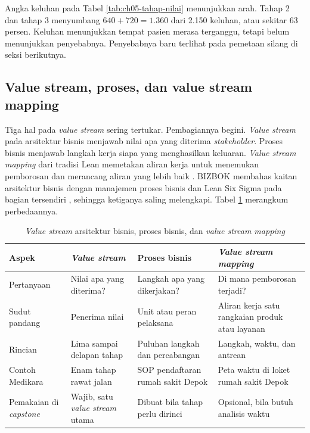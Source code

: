 Angka keluhan pada Tabel \ref{tab:ch05-tahap-nilai} menunjukkan arah. Tahap 2 dan tahap 3
menyumbang $640 + 720 = 1.360$ dari 2.150 keluhan, atau sekitar 63 persen. Keluhan menunjukkan
tempat pasien merasa terganggu, tetapi belum menunjukkan penyebabnya. Penyebabnya baru terlihat
pada pemetaan silang di seksi berikutnya.

\subsection*{Value stream, proses, dan value stream mapping}

Tiga hal pada \textit{value stream} sering tertukar. Pembagiannya begini. \textit{Value stream}
pada arsitektur bisnis menjawab nilai apa yang diterima \textit{stakeholder}. Proses bisnis
menjawab langkah kerja siapa yang menghasilkan keluaran. \textit{Value stream mapping} dari
tradisi Lean memetakan aliran kerja untuk menemukan pemborosan dan merancang aliran yang lebih
baik \cite{c05-rother1999}. BIZBOK membahas kaitan arsitektur bisnis dengan manajemen proses
bisnis dan Lean Six Sigma pada bagian tersendiri \cite{bizbok15}, sehingga ketiganya saling
melengkapi. Tabel \ref{tab:ch05-vs-proses} merangkum perbedaannya.

\begin{table}[!htb]
  \centering
  \caption{\textit{Value stream} arsitektur bisnis, proses bisnis, dan \textit{value stream
           mapping}}
  \label{tab:ch05-vs-proses}
  \small
  \begin{tabularx}{\textwidth}{>{\raggedright\arraybackslash}p{2.2cm}>{\raggedright\arraybackslash}X>{\raggedright\arraybackslash}X>{\raggedright\arraybackslash}X}
    \hline
    \textbf{Aspek} & \textbf{\textit{Value stream}} & \textbf{Proses bisnis} & \textbf{\textit{Value stream mapping}} \\
    \hline
    Pertanyaan & Nilai apa yang diterima? & Langkah apa yang dikerjakan? & Di mana pemborosan terjadi? \\
    \hline
    Sudut pandang & Penerima nilai & Unit atau peran pelaksana & Aliran kerja satu rangkaian produk atau layanan \\
    \hline
    Rincian & Lima sampai delapan tahap & Puluhan langkah dan percabangan & Langkah, waktu, dan antrean \\
    \hline
    Contoh Medikara & Enam tahap rawat jalan & SOP pendaftaran rumah sakit Depok & Peta waktu di loket rumah sakit Depok \\
    \hline
    Pemakaian di \textit{capstone} & Wajib, satu \textit{value stream} utama & Dibuat bila tahap perlu dirinci & Opsional, bila butuh analisis waktu \\
    \hline
  \end{tabularx}
\end{table}

